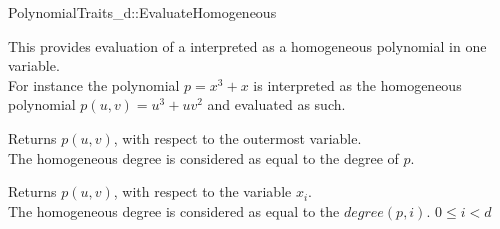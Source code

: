 \begin{ccRefConcept}{PolynomialTraits_d::EvaluateHomogeneous}
\ccDefinition

This  provides evaluation of a 
 interpreted as a homogeneous polynomial 
in one variable.  \\
For instance the polynomial $p = x^3 + x$ is interpreted as the homogeneous polynomial
$p(u,v) = u^3 + uv^2$ and evaluated as such. 

\ccRefines 
{}

\ccTypes


\ccOperations
{}
         { Returns $p(u,v)$, with respect to the outermost variable. \\
           The homogeneous degree is considered as equal to the degree of $p$.  }


          { Returns $p(u,v)$, with respect to the variable $x_i$. \\
            The homogeneous degree is considered as equal to the $degree(p,i)$.
            \ccPrecond $0 \leq i  < d$}


\ccSeeAlso

\\
\\

\end{ccRefConcept}
